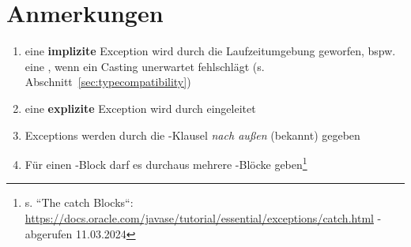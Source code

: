 \section{Anmerkungen}

\begin{enumerate}
    \item eine \textbf{implizite} Exception wird durch die Laufzeitumgebung geworfen, bspw. eine , wenn ein Casting unerwartet fehlschlägt (s. Abschnitt~\ref{sec:typecompatibility})
    \item eine \textbf{explizite} Exception wird durch  eingeleitet
    \item Exceptions werden durch die -Klausel \textit{nach außen} (bekannt) gegeben
    \item Für einen -Block darf es durchaus mehrere -Blöcke geben\footnote{
    s. ``The catch Blocks``: \url{https://docs.oracle.com/javase/tutorial/essential/exceptions/catch.html} - abgerufen 11.03.2024
    }
\end{enumerate}